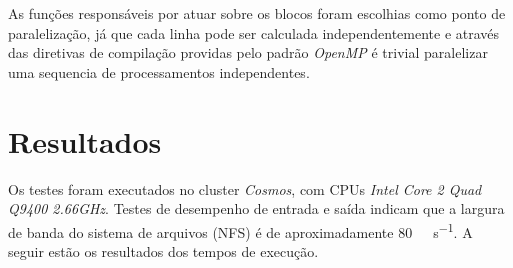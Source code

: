 \documentclass[11pt,towside]{article}
\begin{document}
As funções responsáveis por atuar sobre os blocos foram escolhias como ponto de paralelização, já que cada linha pode ser calculada independentemente e através das diretivas de compilação providas pelo padrão \emph{OpenMP} é trivial paralelizar uma sequencia de processamentos independentes.

\break
\section{Resultados}
\label{sec:res}
Os testes foram executados no cluster \emph{Cosmos}, com CPUs \emph{Intel Core 2 Quad Q9400 2.66GHz}. Testes de desempenho de entrada e saída indicam que a largura de banda do sistema de arquivos (NFS) é de aproximadamente \SI{80}{\mebi\byte\per\second}. A seguir estão os resultados dos tempos de execução.
\end{document}
